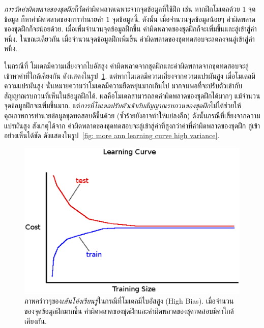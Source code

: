 \textit{การวัดค่าผิดพลาดของชุดฝึก}ก็วัดค่าผิดพลาดเฉพาะจากจุดข้อมูลที่ใช้ฝึก 
เช่น หากฝึกโมเดลด้วย $1$ จุดข้อมูล ก็หาค่าผิดพลาดของการทำนายค่า $1$ จุดข้อมูลนี้.
ดังนั้น เมื่อจำนวนจุดข้อมูลน้อยๆ ค่าผิดพลาดของชุดฝึกก็จะน้อยด้วย.
เมื่อเพิ่มจำนวนจุดข้อมูลฝึกขึ้น ค่าผิดพลาดของชุดฝึกก็จะเพิ่มขึ้นและลู่เข้าสู่ค่าหนึ่ง.
ในขณะเดียวกัน เมื่อจำนวนจุดข้อมูลฝึกเพิ่มขึ้น ค่าผิดพลาดของชุดทดสอบจะลดลงจนลู่เข้าสู่ค่าหนึ่ง.

ในกรณีที่ โมเดลมีความเสี่ยงจากไบอัสสูง ค่าผิดพลาดจากชุดฝึกและค่าผิดพลาดจากชุดทดสอบจะลู่เข้าหาค่าที่ใกล้เคียงกัน ดังแสดงในรูป~\ref{fig: more ann learning curve high bias}.
แต่หากโมเดลมีความเสี่ยงจากความแปรผันสูง 
เมื่อโมเดลมีความแปรผันสูง นั่นหมายความว่าโมเดลมีความยืดหยุ่นมากเกินไป มากจนพอที่จะปรับตัวเข้ากับสัญญาณรบกวนที่เห็นในข้อมูลฝึกได้.
ผลคือโมเดลสามารถลดค่าผิดพลาดของชุดฝึกได้มากๆ แม้จำนวนจุดข้อมูลฝึกจะเพิ่มขึ้นมาก.
แต่\textit{การที่โมเดลปรับตัวเข้ากับสัญญาณรบกวนของชุดฝึก}ไม่ได้ช่วยให้คุณภาพการทำนายข้อมูลชุดทดสอบดีขึ้นด้วย
 (ซ้ำร้ายยังอาจทำให้แย่ลงอีก) 
ดังนั้นกรณีที่เสี่ยงจากความแปรผันสูง สังเกตุได้จาก ค่าผิดพลาดของชุดทดสอบจะลู่เข้าสู่ค่าที่สูงกว่าค่าที่ค่าผิดพลาดของชุดฝึก ลู่เข้าอย่างเห็นได้ชัด
ดังแสดงในรูป~\ref{fig: more ann learning curve high variance}.

%
\begin{figure}
\begin{center}
\includegraphics[height=3in]{04ANNlearncurve/LCHighBias.eps}
\end{center}
\caption{ภาพคร่าวๆของ\textit{เส้นโค้งเรียนรู้}ในกรณีที่โมเดลมีไบอัสสูง (High Bias). 
เมื่อจำนวนของจุดข้อมูลฝึกมากขึ้น ค่าผิดพลาดของชุดฝึกและค่าผิดพลาดของชุดทดสอบมีค่าใกล้เคียงกัน.}
\label{fig: more ann learning curve high bias}
\end{figure}

